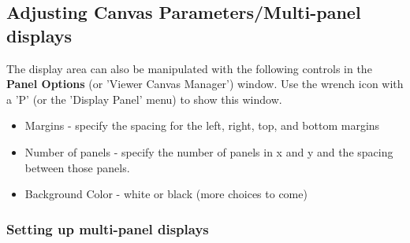 


% 

\subsection{Adjusting Canvas Parameters/Multi-panel displays}
\label{section:display.viewerGUI.canvas}

The display area can also be manipulated with the following controls in
the {\bf Panel Options} (or 'Viewer Canvas Manager') window.
Use the wrench icon with a 'P' (or the 'Display Panel' menu) to show this
window.
\begin{itemize}
   \item Margins - specify the spacing for the left, right, top, and bottom margins
   \item Number of panels - specify the number of panels in x and y
         and the spacing between those panels.
   \item Background Color - white or black (more choices to come)
\end{itemize}

\subsubsection{Setting up multi-panel displays}
\label{section:display.viewerGUI.canvas.multi}

